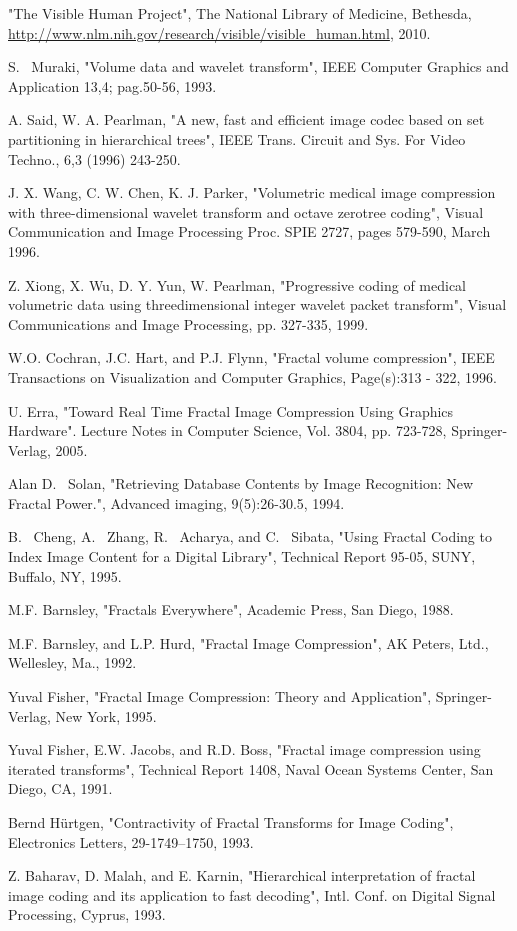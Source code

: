 \documentclass[10pt, conference, compsocconf]{IEEEtran}
\begin{document}
\begin{thebibliography}{1}

"The Visible Human Project", The National Library of Medicine, Bethesda, \url{http://www.nlm.nih.gov/research/visible/visible_human.html}, 2010.

S. ~Muraki, "Volume data and wavelet transform", IEEE Computer Graphics and Application 13,4; pag.50-56, 1993.

A. Said, W. A. Pearlman, "A new, fast and efficient image codec based on set partitioning in hierarchical trees", IEEE Trans. Circuit and Sys. For Video Techno., 6,3 (1996) 243-250.

J. X. Wang, C. W. Chen, K. J. Parker, "Volumetric medical image compression with three-dimensional wavelet transform and octave zerotree coding", Visual Communication and Image Processing Proc. SPIE 2727, pages 579-590, March 1996.

Z. Xiong, X. Wu, D. Y. Yun, W. Pearlman, "Progressive coding of medical volumetric data using threedimensional integer wavelet packet transform", Visual Communications and Image Processing, pp. 327-335, 1999.

W.O. Cochran, J.C. Hart, and P.J. Flynn, "Fractal volume compression", IEEE Transactions on Visualization and Computer Graphics, Page(s):313 - 322, 1996.

U. Erra, "Toward Real Time Fractal Image Compression Using Graphics Hardware". Lecture Notes in Computer Science, Vol. 3804, pp. 723-728, Springer-Verlag, 2005.

Alan D. ~Solan, "Retrieving Database Contents by Image Recognition: New Fractal Power.", Advanced imaging, 9(5):26-30.5, 1994.

B. ~Cheng, A. ~Zhang, R. ~Acharya, and C. ~Sibata, "Using Fractal Coding to Index Image Content for a Digital Library", Technical Report 95-05, SUNY, Buffalo, NY, 1995.

M.F. Barnsley, "Fractals Everywhere", Academic Press, San Diego, 1988.

M.F. Barnsley, and L.P. Hurd, "Fractal Image Compression", AK Peters, Ltd., Wellesley, Ma., 1992.

Yuval Fisher, "Fractal Image Compression: Theory and Application", Springer-Verlag, New York, 1995.

Yuval Fisher, E.W. Jacobs, and R.D. Boss, "Fractal image compression using iterated transforms", Technical Report 1408, Naval Ocean Systems Center, San Diego, CA, 1991.

Bernd H\"{u}rtgen, "Contractivity of Fractal Transforms for Image Coding", Electronics Letters, 29-1749--1750, 1993.

Z. Baharav, D. Malah, and E. Karnin, "Hierarchical interpretation of fractal image coding and its application to fast decoding", Intl. Conf. on Digital Signal Processing, Cyprus, 1993.

\end{thebibliography}


\end{document}

